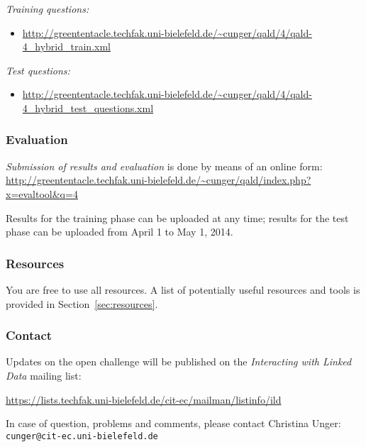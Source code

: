 \documentclass[a4paper]{article}
\begin{document}
{{\em Training questions:} 

\vspace{-.3cm}

\begin{itemize} 
\item \url{http://greententacle.techfak.uni-bielefeld.de/~cunger/qald/4/qald-4_hybrid_train.xml} 
\end{itemize} 

{\em Test questions:} 

\vspace{-.3cm}

\begin{itemize}
\item \url{http://greententacle.techfak.uni-bielefeld.de/~cunger/qald/4/qald-4_hybrid_test_questions.xml} 
\end{itemize}

\subsubsection*{Evaluation}

{\em Submission of results and evaluation} is done by means of an online form:\\
\url{http://greententacle.techfak.uni-bielefeld.de/~cunger/qald/index.php?x=evaltool&q=4}

Results for the training phase can be uploaded at any time; results for the test phase can be uploaded from April 1 to May 1, 2014.

\subsubsection*{Resources}

You are free to use all resources. A list of potentially useful resources and tools is provided in Section~\ref{sec:resources}.

\subsubsection*{Contact}

Updates on the open challenge will be published on the \emph{Interacting with Linked Data} mailing list: 

\url{https://lists.techfak.uni-bielefeld.de/cit-ec/mailman/listinfo/ild}

In case of question, problems and comments, please contact Christina Unger:
{\tt cunger@cit-ec.uni-bielefeld.de}

}
\end{document}
